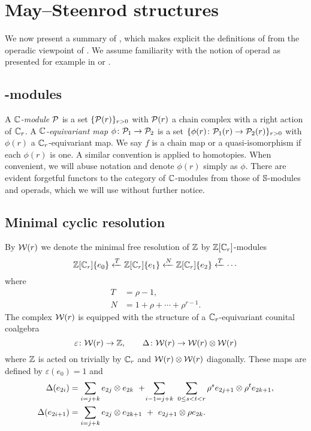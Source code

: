 
\section{May--Steenrod structures}\label{s:may_st}

We now present a summary of \cite{medina2021may_st}, which makes explicit the definitions of \cite{steenrod1953cyclic} from the operadic viewpoint of \cite{may1970general}.
We assume familiarity with the notion of operad as presented for example in \cite{may1997operads} or \cite{loday2012operads}.

\subsection{\pdfC-modules}

A \textit{$\mathbb{C}$-module} $\mathcal{P}$ is a set $\{\mathcal{P}(r)\}_{r>0}$ with $\mathcal{P}(r)$ a chain complex with a right action of $\mathbb{C}_r$.
A \textit{$\mathbb{C}$-equivariant map} $\phi \colon \mathcal{P}_1 \to \mathcal{P}_2$ is a set $\{\phi(r) \colon \mathcal{P}_1(r) \to \mathcal{P}_2(r)\}_{r>0}$ with $\phi(r)$ a $\mathbb{C}_r$-equivariant map.
We say $f$ is a chain map or a quasi-isomorphism if each $\phi(r)$ is one.
A similar convention is applied to homotopies.
When convenient, we will abuse notation and denote $\phi(r)$ simply as $\phi$.
There are evident forgetful functors to the category of $\mathbb{C}$-modules from those of $\mathbb{S}$-modules and operads, which we will use without further notice.

\subsection{Minimal cyclic resolution}

By $\mathcal{W}(r)$ we denote the minimal free resolution of $\mathbb{Z}$ by $\mathbb{Z}[\mathbb{C}_r]$-modules
\[
\mathbb{Z}[\mathbb{C}_r]\{e_0\} \xleftarrow{T} \mathbb{Z}[\mathbb{C}_r]\{e_1\} \xleftarrow{N} \mathbb{Z}[\mathbb{C}_r]\{e_2\} \xleftarrow{T} \cdots
\]
where
\[
\begin{split}
	T &= \rho - 1, \\
	N &= 1 + \rho + \cdots + \rho^{r-1}.
\end{split}
\]
The complex $\mathcal{W}(r)$ is equipped with the structure of a $\mathbb{C}_r$-equivariant counital coalgebra
\[
\varepsilon \colon \mathcal{W}(r) \to \mathbb{Z}, \qquad
\Delta \colon \mathcal{W}(r) \to \mathcal{W}(r) \otimes \mathcal{W}(r)
\]
where $\mathbb{Z}$ is acted on trivially by $\mathbb{C}_r$ and $\mathcal{W}(r) \otimes \mathcal{W}(r)$ diagonally.
These maps are defined by $\varepsilon(e_0) = 1$ and
\begin{align*}
	\Delta(e_{2i}) &=
	\sum_{i=j+k} e_{2j} \otimes e_{2k} \ + \! \sum_{i-1=j+k} \ \sum_{0 \leq s < t < r} \rho^s e_{2j+1} \otimes \rho^t e_{2k+1}, \\
	\Delta(e_{2i+1}) &=
	\sum_{i=j+k} e_{2j} \otimes e_{2k+1} \ +\ e_{2j+1} \otimes \rho e_{2k}.
\end{align*}

